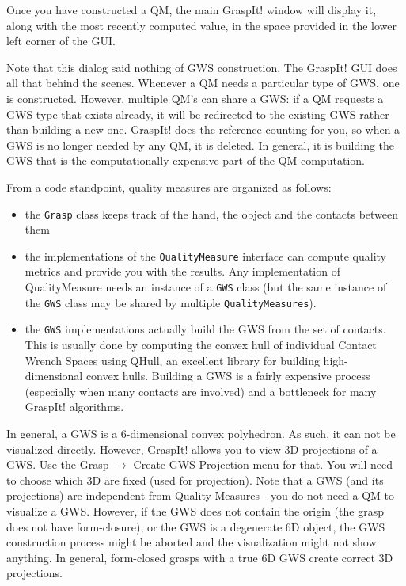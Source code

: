 Once you have constructed a QM, the main GraspIt! window will display
it, along with the most recently computed value, in the space provided
in the lower left corner of the GUI.

Note that this dialog said nothing of GWS construction. The GraspIt!
GUI does all that behind the scenes. Whenever a QM needs a particular
type of GWS, one is constructed. However, multiple QM's can share a
GWS: if a QM requests a GWS type that exists already, it will be
redirected to the existing GWS rather than building a new
one. GraspIt! does the reference counting for you, so when a GWS is no
longer needed by any QM, it is deleted. In general, it is building the
GWS that is the computationally expensive part of the QM computation.

From a code standpoint, quality measures are organized as follows:
\begin{itemize}
\item the \texttt{Grasp} class keeps track of the hand, the object and
  the contacts between them
\item the implementations of the \texttt{QualityMeasure} interface can
  compute quality metrics and provide you with the results. Any
  implementation of QualityMeasure needs an instance of a \texttt{GWS}
  class (but the same instance of the \texttt{GWS} class may be shared
  by multiple \texttt{QualityMeasures}).
\item the \texttt{GWS} implementations actually build the GWS from the
  set of contacts. This is usually done by computing the convex hull
  of individual Contact Wrench Spaces using QHull, an excellent
  library for building high-dimensional convex hulls. Building a GWS
  is a fairly expensive process (especially when many contacts are
  involved) and a bottleneck for many GraspIt! algorithms.
\end{itemize}

In general, a GWS is a 6-dimensional convex polyhedron. As such, it
can not be visualized directly. However, GraspIt! allows you to view
3D projections of a GWS. Use the Grasp $\rightarrow$ Create GWS Projection menu
for that. You will need to choose which 3D are fixed (used for
projection). Note that a GWS (and its projections) are independent
from Quality Measures - you do not need a QM to visualize a
GWS. However, if the GWS does not contain the origin (the grasp does
not have form-closure), or the GWS is a degenerate 6D object, the GWS
construction process might be aborted and the visualization might not
show anything. In general, form-closed grasps with a true 6D GWS
create correct 3D projections.

